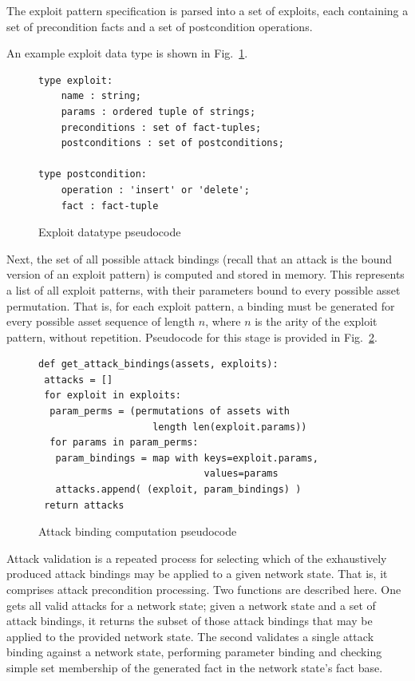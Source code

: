 The exploit pattern specification is parsed into a set of exploits, each
containing a set of precondition facts and a set of postcondition operations.

An example exploit data type is shown in
Fig.~\ref{fig:exploit_pc}.

\begin{figure}
\begin{lstlisting}
type exploit:
    name : string;
    params : ordered tuple of strings;
    preconditions : set of fact-tuples;
    postconditions : set of postconditions;
    
type postcondition:
    operation : 'insert' or 'delete';
    fact : fact-tuple
\end{lstlisting}
\caption{Exploit datatype pseudocode}
\label{fig:exploit_pc}
\end{figure}

Next, the set of all possible attack bindings (recall that an attack is the
bound version of an exploit pattern) is computed and stored in memory. This
represents a list of all exploit patterns, with their parameters bound to
every possible asset permutation. That is, for each exploit pattern, a
binding must be generated for every possible asset sequence of length $n$,
where $n$ is the arity of the exploit pattern, without repetition. Pseudocode
for this stage is provided in Fig.~\ref{fig:binding_computation_pc}.

\begin{figure}
\begin{lstlisting}
def get_attack_bindings(assets, exploits): 
 attacks = [] 
 for exploit in exploits:
  param_perms = (permutations of assets with 
                    length len(exploit.params))
  for params in param_perms:
   param_bindings = map with keys=exploit.params,
                             values=params
   attacks.append( (exploit, param_bindings) )
 return attacks
\end{lstlisting}
\caption{Attack binding computation pseudocode}
\label{fig:binding_computation_pc}
\end{figure}

Attack validation is a repeated process for selecting which of the exhaustively
produced attack bindings may be applied to a given network state. That is,
it comprises attack precondition processing. Two functions are described here.
One gets all valid attacks for a network state; given a network state
and a set of attack bindings, it returns the subset of those attack bindings
that may be applied to the provided network state. The second validates a
single attack binding against a network state, performing parameter binding and
checking simple set membership of the generated fact in the network state's
fact base.

